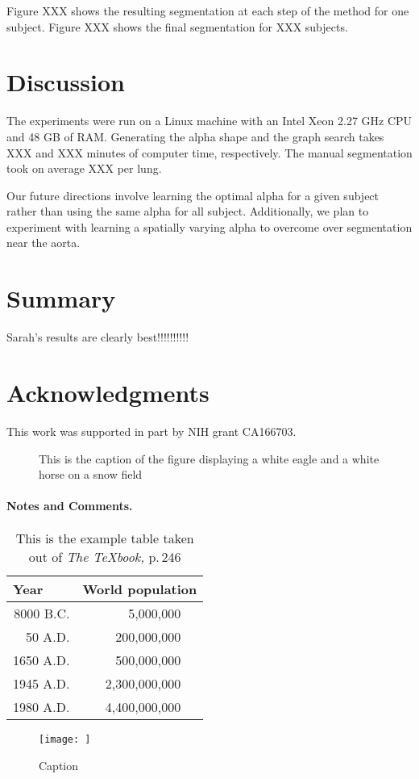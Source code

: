 \documentclass{llncs}
\begin{document}
Figure XXX shows the resulting segmentation at each step of the method for one subject. Figure XXX shows the final segmentation for XXX subjects. 
%
\section{Discussion}
%
The experiments were run on a Linux machine with an Intel Xeon 2.27 GHz CPU and 48 GB of RAM. Generating the alpha shape and the graph search takes XXX and XXX minutes of computer time, respectively. The manual segmentation took on average XXX per lung.

Our future directions involve learning the optimal alpha for a given subject rather than using the same alpha for all subject. Additionally, we plan to experiment with learning a spatially varying alpha to overcome over segmentation near the aorta.
%
\section{Summary}
%
Sarah's results are clearly best!!!!!!!!!!
%
\section{Acknowledgments}
%
This work was supported in part by NIH grant CA166703.



\iffalse

\begin{figure}
\vspace{2.5cm}
\caption{This is the caption of the figure displaying a white eagle and
a white horse on a snow field}
\end{figure}


%
\paragraph{Notes and Comments.}


\begin{table}
\caption{This is the example table taken out of {\it The
\TeX{}book,} p.\,246}
\begin{center}
\begin{tabular}{r@{\quad}rl}
\hline
\multicolumn{1}{l}{\rule{0pt}{12pt}
                   Year}&\multicolumn{2}{l}{World population}\\[2pt]
\hline\rule{0pt}{12pt}
8000 B.C.  &     5,000,000& \\
  50 A.D.  &   200,000,000& \\
1650 A.D.  &   500,000,000& \\
1945 A.D.  & 2,300,000,000& \\
1980 A.D.  & 4,400,000,000& \\[2pt]
\hline
\end{tabular}
\end{center}
\end{table}
\begin{figure}
    \centering
    \texttt{[image: ]}
    \caption{Caption}
    \label{fig:my_label}
\end{figure}
\end{document}
